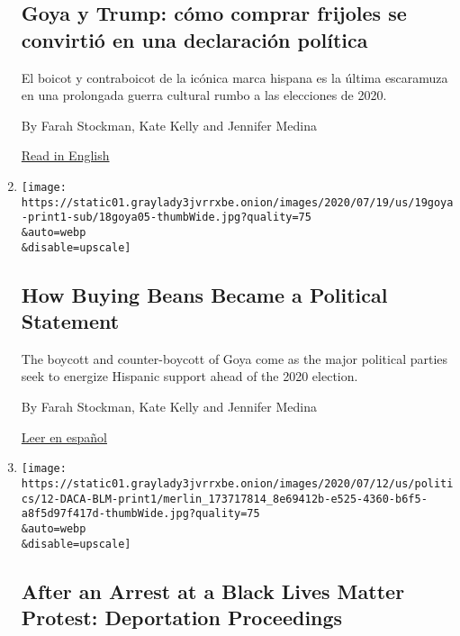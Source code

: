 \begin{enumerate}
{  \subsection{Goya y Trump: cómo comprar frijoles se convirtió en una
  declaración
  política}\label{goya-y-trump-cuxf3mo-comprar-frijoles-se-convirtiuxf3-en-una-declaraciuxf3n-poluxedtica}}

  El boicot y contraboicot de la icónica marca hispana es la última
  escaramuza en una prolongada guerra cultural rumbo a las elecciones de
  2020.

  By Farah Stockman, Kate Kelly and Jennifer Medina

  \href{https://www.nytimes3xbfgragh.onion/2020/07/19/us/goya-trump-hispanic-vote.html}{Read
  in English}
\item
  \href{/2020/07/19/us/goya-trump-hispanic-vote.html}{}

  \texttt{[image: https://static01.graylady3jvrrxbe.onion/images/2020/07/19/us/19goya-print1-sub/18goya05-thumbWide.jpg?quality=75\\\&auto=webp\\\&disable=upscale]}

  \hypertarget{how-buying-beans-became-a-political-statement}{%
  \subsection{How Buying Beans Became a Political
  Statement}\label{how-buying-beans-became-a-political-statement}}

  The boycott and counter-boycott of Goya come as the major political
  parties seek to energize Hispanic support ahead of the 2020 election.

  By Farah Stockman, Kate Kelly and Jennifer Medina

  \href{https://www.nytimes3xbfgragh.onion/es/2020/07/19/espanol/goya-boicot-trump.html}{Leer
  en español}
\item
  \href{/2020/07/11/us/politics/black-lives-matter-phoenix-daca.html}{}

  \texttt{[image: https://static01.graylady3jvrrxbe.onion/images/2020/07/12/us/politics/12-DACA-BLM-print1/merlin\_173717814\_8e69412b-e525-4360-b6f5-a8f5d97f417d-thumbWide.jpg?quality=75\\\&auto=webp\\\&disable=upscale]}

  \hypertarget{after-an-arrest-at-a-black-lives-matter-protest-deportation-proceedings}{%
  \subsection{After an Arrest at a Black Lives Matter Protest:
  Deportation
  Proceedings}\label{after-an-arrest-at-a-black-lives-matter-protest-deportation-proceedings}}


\end{enumerate}
